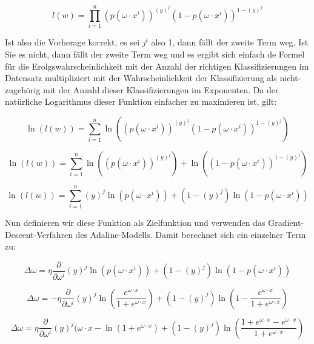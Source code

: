 \documentclass[11pt]{article} %
\begin{document}
\begin{equation}
l(w) = \prod_{i = 1}^n (p(\omega \cdot x^i))^{(y)^j} (1-p(\omega\cdot x^i))^{1-(y)^j}
\end{equation} 

Ist also die Vorherage korrekt, es sei $j^i$ also 1, dann fällt der zweite Term weg. Ist Sie es nicht, dann fällt der zweite Term weg und es ergibt sich einfach de Formel für die Erolgswahrscheinlichkeit mit der Anzahl der richtigen Klassifizierungen im Datensatz multipliziert
mit der Wahrscheinlichkeit der Klassifizierung als nicht-zugehörig mit der Anzahl dieser Klassifizierungen im Exponenten. Da der natürliche Logarithmus dieser Funktion einfacher zu maximieren ist, gilt:

\begin{equation}
\ln(l(w)) = \sum_{i = 1}^n \ln((p(\omega \cdot x^i))^{(y)^j} (1-p(\omega\cdot x^i))^{1-(y)^j})
\end{equation} 

\begin{equation}
\ln(l(w)) = \sum_{i = 1}^n \ln((p(\omega \cdot x^i))^{(y)^j}) + \ln((1-p(\omega\cdot x^i))^{1-(y)^j})
\end{equation} 

\begin{equation}
\ln(l(w)) = \sum_{i = 1}^n (y)^j \ln(p(\omega \cdot x^i)) + (1-(y)^j) \ln(1-p(\omega\cdot x^i))
\end{equation} 

Nun definieren wir diese Funktion als Zielfunktion und verwenden das Gradient-Descent-Verfahren des Adaline-Modells. Damit berechnet sich ein einzelner Term zu:

\begin{equation}
\Delta \omega = \eta \frac{\partial}{\partial \omega^i}  (y)^j \ln(p(\omega \cdot x^i)) + (1-(y)^j) \ln(1-p(\omega\cdot x^i))
\end{equation}

\begin{equation}
\Delta \omega = -\eta \frac{\partial}{\partial \omega^i}  (y)^j \ln( \frac{e^{\omega \cdot x}}{1+e^{\omega \cdot x}}) + (1-(y)^j) \ln(1- \frac{e^{\omega \cdot x}}{1+e^{\omega \cdot x}})
\end{equation}

\begin{equation}
\Delta \omega = \eta \frac{\partial}{\partial \omega^i}  (y)^j (\omega \cdot x - \ln(1+e^{\omega \cdot x}) + (1-(y)^j) \ln( \frac{1+e^{\omega \cdot x}-e^{\omega \cdot x}}{1+e^{\omega \cdot x}})
\end{equation}
\end{document}
